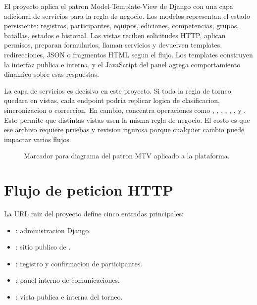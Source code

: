 El proyecto aplica el patron Model-Template-View de Django con una capa adicional de servicios para la regla de negocio. Los modelos representan el estado persistente: registros, participantes, equipos, ediciones, competencias, grupos, batallas, estados e historial. Las vistas reciben solicitudes HTTP, aplican permisos, preparan formularios, llaman servicios y devuelven templates, redirecciones, JSON o fragmentos HTML segun el flujo. Los templates construyen la interfaz publica e interna, y el JavaScript del panel agrega comportamiento dinamico sobre esas respuestas.

La capa de servicios es decisiva en este proyecto. Si toda la regla de torneo quedara en vistas, cada endpoint podria replicar logica de clasificacion, sincronizacion o correccion. En cambio,  concentra operaciones como , , , , , ,  y . Esto permite que distintas vistas usen la misma regla de negocio. El costo es que ese archivo requiere pruebas y revision rigurosa porque cualquier cambio puede impactar varios flujos.

\begin{figure}[H]
  \centering
  \caption{Marcador para diagrama del patron MTV aplicado a la plataforma.}
  \label{fig:arquitectura-mtv-servicios}
\end{figure}

\section{Flujo de peticion HTTP}
\label{sec:arquitectura-http}

La URL raiz del proyecto define cinco entradas principales:

\begin{itemize}
  \item {}: administracion Django.
  \item \ruta{/}: sitio publico de .
  \item {}: registro y confirmacion de participantes.
  \item {}: panel interno de comunicaciones.
  \item {}: vista publica e interna del torneo.
\end{itemize}


